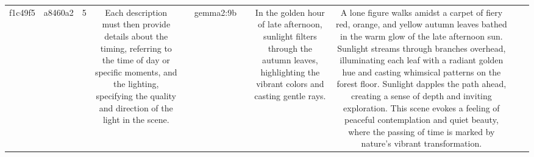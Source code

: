 \begin{table}[h!]
\begin{tabular}{|c|c|c|c|c|c|c|c|c|c|c|}
f1c49f5 & a8460a2 & 5 & Each description must then provide details about the timing, referring to the time of day or specific moments, and the lighting, specifying the quality and direction of the light in the scene. &  & gemma2:9b &  & In the golden hour of late afternoon, sunlight filters through the autumn leaves, highlighting the vibrant colors and casting gentle rays. & A lone figure walks amidst a carpet of fiery red, orange, and yellow autumn leaves bathed in the warm glow of the late afternoon sun.  Sunlight streams through branches overhead, illuminating each leaf with a radiant golden hue and casting whimsical patterns on the forest floor. Sunlight dapples the path ahead, creating a sense of depth and inviting exploration. This scene evokes a feeling of peaceful contemplation and quiet beauty, where the passing of time is marked by nature's vibrant transformation. 



\end{tabular}
\end{table}
